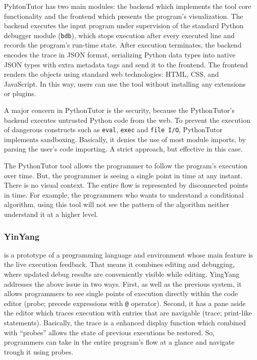 PyhtonTutor has two main modules: the backend which implements the tool core functionality and the frontend which presents the program's visualization. The backend executes the input program under supervision of the standard Python debugger module (\texttt{bdb}), which stops execution after every executed line and records the program's run-time state. After execution terminates, the backend encodes the trace in JSON format, serializing Python data types into native JSON types with extra metadata tags and send it to the frontend. The frontend renders the objects using standard web technologies: HTML, CSS, and JavaScript. In this way, users can use the tool without installing any extensions or plugins.

A major concern in PythonTutor is the security, because the PythonTutor's backend executes untrusted Python code from the web. To prevent the execution of dangerous constructs such as {\tt eval}, {\tt exec} and {\tt file I/O}, PythonTutor implements sandboxing. Basically, it denies the use of most module imports, by parsing the user's code importing. A strict approach, but effective in this case.

The PythonTutor tool allows the programmer to follow the program's execution over time. But, the programmer is seeing a single point in time at any instant. There is no visual context. The entire flow is represented by disconnected points in time. For example, the programmers who wants to understand a conditional algorithm, using this tool will not see the pattern of the algorithm neither understand it at a higher level.
\subsubsection{YinYang~\cite{mcdirmid2013usable}} is a prototype of a programming language and environment whose main feature is the live execution feedback. That means it combines editing and debugging, where updated debug results are conveniently visible while editing. YingYang addresses the above issue in two ways. First, as well as the previous system, it allows programmers to see single points of execution directly within the code editor (probe; precede expressions with \texttt{@} operator). Second, it has a pane aside the editor which traces execution with entries that are navigable (trace; print-like statements). Basically, the trace is a enhanced display function which combined with ``probes'' allows the state of previous executions be restored. So, programmers can take in the entire program's flow at a glance and navigate trough it using probes.

